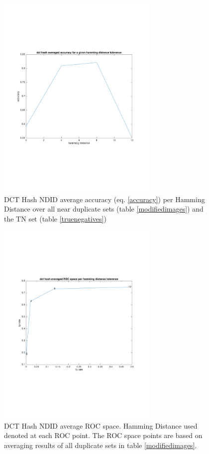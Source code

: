 \documentclass[english,12pt,a4paper,pdftex,elec,utf8]{aaltothesis}
\begin{document}
\begin{figure}[htb]
\begin{center}
\includegraphics[height=10cm]{figures/dctTotalAccuracy}
\end{center}
\caption{DCT Hash NDID average accuracy (eq. \ref{accuracy}) per Hamming Distance over all near duplicate sets (table \ref{modifiedimages}) and the TN set (table \ref{truenegatives})}
\label{dcttotalaccuracy}
\end{figure}

\begin{figure}[htb]
\begin{center}
\includegraphics[height=10cm]{figures/dctTotalROC}
\end{center}
\caption{DCT Hash NDID average ROC space. Hamming Distance used denoted at each ROC point. The ROC space points are based on averaging results of all duplicate sets in table \ref{modifiedimages}.}
\label{dcttotalroc}
\end{figure}
\end{document}
